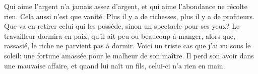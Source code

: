 Qui aime l’argent n’a jamais assez d’argent,
	et qui aime l’abondance ne récolte rien.
	Cela aussi n’est que vanité.
Plus il y a de richesses, plus il y a de profiteurs.
Que va en retirer celui qui les possède, sinon un spectacle pour ses yeux?
Le travailleur dormira en paix, qu’il ait peu ou beaucoup à manger,
	alors que, rassasié, le riche ne parvient pas à dormir.
Voici un triste cas que j’ai vu sous le soleil:
	une fortune amassée pour le malheur de son maître.
Il perd son avoir dans une mauvaise affaire,
	et quand lui naît un fils, celui-ci n’a rien en main.
